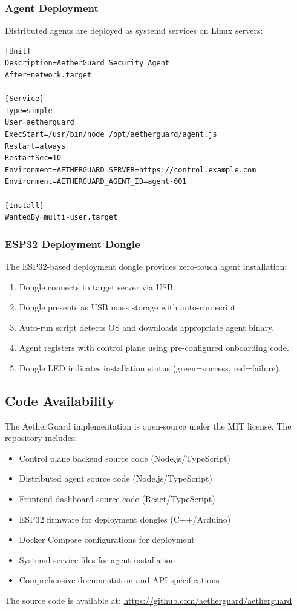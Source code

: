 \subsubsection{Agent Deployment}

Distributed agents are deployed as systemd services on Linux servers:

\begin{verbatim}
[Unit]
Description=AetherGuard Security Agent
After=network.target

[Service]
Type=simple
User=aetherguard
ExecStart=/usr/bin/node /opt/aetherguard/agent.js
Restart=always
RestartSec=10
Environment=AETHERGUARD_SERVER=https://control.example.com
Environment=AETHERGUARD_AGENT_ID=agent-001

[Install]
WantedBy=multi-user.target
\end{verbatim}

\subsubsection{ESP32 Deployment Dongle}

The ESP32-based deployment dongle provides zero-touch agent installation:

\begin{enumerate}
    \item Dongle connects to target server via USB.
    \item Dongle presents as USB mass storage with auto-run script.
    \item Auto-run script detects OS and downloads appropriate agent binary.
    \item Agent registers with control plane using pre-configured onboarding code.
    \item Dongle LED indicates installation status (green=success, red=failure).
\end{enumerate}

\subsection{Code Availability}
\label{subsec:code}

The AetherGuard implementation is open-source under the MIT license. The repository includes:

\begin{itemize}
    \item Control plane backend source code (Node.js/TypeScript)
    \item Distributed agent source code (Node.js/TypeScript)
    \item Frontend dashboard source code (React/TypeScript)
    \item ESP32 firmware for deployment dongles (C++/Arduino)
    \item Docker Compose configurations for deployment
    \item Systemd service files for agent installation
    \item Comprehensive documentation and API specifications
\end{itemize}

The source code is available at: \url{https://github.com/aetherguard/aetherguard}

